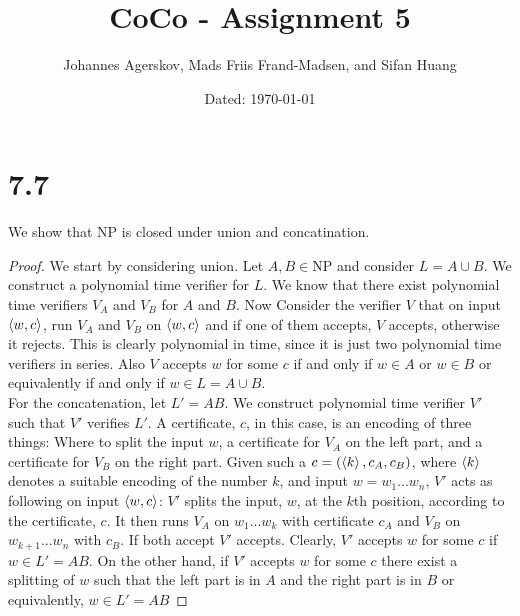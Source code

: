 \documentclass[a4paper,11pt]{article}
\author{Johannes Agerskov, Mads Friis Frand-Madsen, and Sifan Huang}
\date{Dated: \today}
\title{CoCo - Assignment 5}
\numberwithin{equation}{section}
\begin{document}
\maketitle
\section*{7.7}
We show that NP is closed under union and concatination.\begin{proof}
	We start by considering union. Let $ A,B\in \text{NP} $ and consider $ L=A\cup B $. We construct a polynomial time verifier for $ L $. We know that there exist polynomial time verifiers $ V_A $ and $ V_B $ for $ A $ and $ B $. Now Consider the verifier $ V $ that on input $ \braket{w,c} $, run $ V_A $ and $ V_B $ on $ \braket{w,c} $ and if one of them accepts, $ V $ accepts, otherwise it rejects. This is clearly polynomial in time, since it is just two polynomial time verifiers in series. Also $ V $ accepts $ w $ for some $ c $ if and only if $ w\in A $ or $ w\in B $ or equivalently if and only if $ w\in L=A\cup B $.\\
	 For the concatenation, let $ L'=AB $. We construct polynomial time verifier $ V' $ such that $ V' $ verifies $ L' $. A certificate, $ c $, in this case, is an encoding of three things: Where to split the input $ w $, a certificate for $ V_A $ on the left part, and a certificate for $ V_B $ on the right part. Given such a $ c=(\braket{k},c_A,c_B) $, where $ \braket{k} $ denotes a suitable encoding of the number $ k $, and input $ w=w_1...w_n $, $ V' $ acts as following on input $ \braket{w,c} $: $ V' $ splits the input, $ w $, at the $ k $th position, according to the certificate, $ c $. It then runs $ V_A $ on $ w_1...w_k $ with certificate $ c_A $ and $ V_B $ on $ w_{k+1}...w_n $ with $ c_B $. If both accept $ V' $ accepts. Clearly, $ V' $ accepts $ w $ for some $ c $ if $ w\in L'=AB $. On the other hand, if $ V' $ accepts $ w $ for some $ c $ there exist a splitting of $ w $ such that the left part is in $ A $ and the right part is in $ B $ or equivalently, $ w\in L'=AB $
\end{proof}
\end{document}
